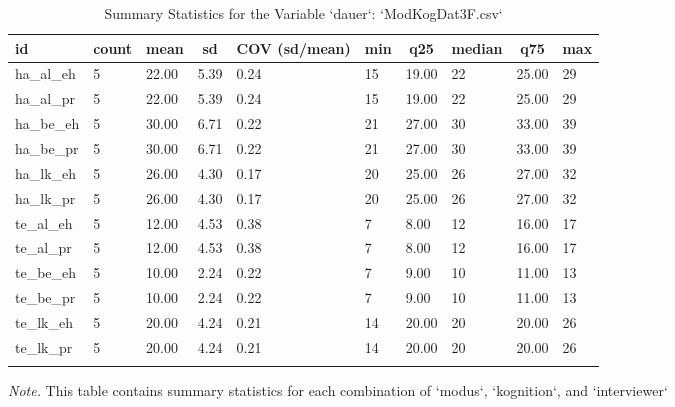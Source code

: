 \documentclass[
  doc,floatsintext]{apa6}
\begin{document}
\begin{table}[tbp]

\begin{center}
\begin{threeparttable}

\caption{\label{tab:tabsummary3}Summary Statistics for the Variable `dauer`:  `ModKogDat3F.csv`}

\begin{tabular}{llllllllll}
\toprule
id & \multicolumn{1}{c}{count} & \multicolumn{1}{c}{mean} & \multicolumn{1}{c}{sd} & \multicolumn{1}{c}{COV (sd/mean)} & \multicolumn{1}{c}{min} & \multicolumn{1}{c}{q25} & \multicolumn{1}{c}{median} & \multicolumn{1}{c}{q75} & \multicolumn{1}{c}{max}\\
\midrule
ha\_al\_eh & 5 & 22.00 & 5.39 & 0.24 & 15 & 19.00 & 22 & 25.00 & 29\\
ha\_al\_pr & 5 & 22.00 & 5.39 & 0.24 & 15 & 19.00 & 22 & 25.00 & 29\\
ha\_be\_eh & 5 & 30.00 & 6.71 & 0.22 & 21 & 27.00 & 30 & 33.00 & 39\\
ha\_be\_pr & 5 & 30.00 & 6.71 & 0.22 & 21 & 27.00 & 30 & 33.00 & 39\\
ha\_lk\_eh & 5 & 26.00 & 4.30 & 0.17 & 20 & 25.00 & 26 & 27.00 & 32\\
ha\_lk\_pr & 5 & 26.00 & 4.30 & 0.17 & 20 & 25.00 & 26 & 27.00 & 32\\
te\_al\_eh & 5 & 12.00 & 4.53 & 0.38 & 7 & 8.00 & 12 & 16.00 & 17\\
te\_al\_pr & 5 & 12.00 & 4.53 & 0.38 & 7 & 8.00 & 12 & 16.00 & 17\\
te\_be\_eh & 5 & 10.00 & 2.24 & 0.22 & 7 & 9.00 & 10 & 11.00 & 13\\
te\_be\_pr & 5 & 10.00 & 2.24 & 0.22 & 7 & 9.00 & 10 & 11.00 & 13\\
te\_lk\_eh & 5 & 20.00 & 4.24 & 0.21 & 14 & 20.00 & 20 & 20.00 & 26\\
te\_lk\_pr & 5 & 20.00 & 4.24 & 0.21 & 14 & 20.00 & 20 & 20.00 & 26\\
\bottomrule
\addlinespace
\end{tabular}

\begin{tablenotes}[para]
\normalsize{\textit{Note.} This table contains summary statistics for each combination of `modus`,  `kognition`, and `interviewer`}
\end{tablenotes}

\end{threeparttable}
\end{center}

\end{table}
\end{document}
